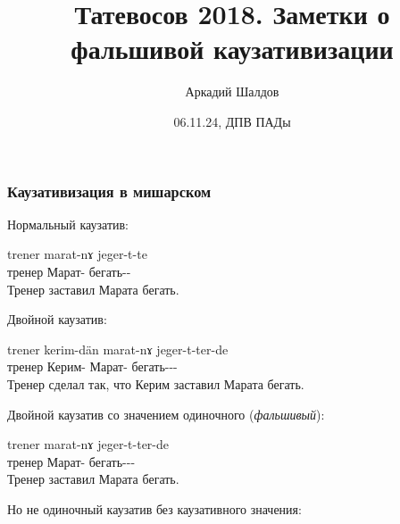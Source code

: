 \documentclass[9pt]{beamer}
\title{Татевосов 2018. Заметки о фальшивой каузативизации \parencite{tatevosov2018zametkifalshivoykauzativizacii}}
\author{Аркадий Шалдов}
\date{06.11.24, ДПВ ПАДы}
\begin{document}

\begin{frame}
    \titlepage
\end{frame}

\begin{frame}
    \frametitle{Каузативизация в мишарском}

    Нормальный каузатив:

    \begin{exe}
        \ex \gll trener marat-nɤ jeger-t-te\\
            тренер Марат-\Acc{} бегать-\Caus-\Pst\\
            \trans Тренер заставил Марата бегать.
    \end{exe}

    Двойной каузатив:

    \begin{exe}
        \ex \gll trener        kerim-dän        marat-nɤ       jeger-t-ter-de\\
            тренер        Керим-\Abl{}        Марат-\Acc{} бегать-\Caus-\Caus-\Pst\\
            \trans Тренер сделал так, что Керим заставил Марата бегать.
    \end{exe}

    Двойной каузатив со значением одиночного (\emph{фальшивый}):

    \begin{exe}
        \ex \gll trener marat-nɤ jeger-t-ter-de\\
            тренер Марат-\Acc{} бегать-\Caus-\Caus-\Pst\\
            \trans Тренер заставил Марата бегать.
    \end{exe}

    Но не одиночный каузатив без каузативного значения:

    \begin{exe}
    \end{exe}

\end{frame}
\end{document}
